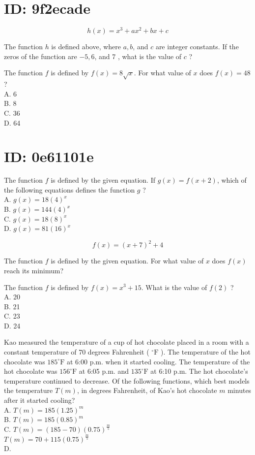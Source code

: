 \section*{ID: 9f2ecade}
$$
h(x)=x^{3}+a x^{2}+b x+c
$$

The function $h$ is defined above, where $a, b$, and $c$ are integer constants. If the zeros of the function are $-5,6$, and 7 , what is the value of $c$ ?

The function $f$ is defined by $f(x)=8 \sqrt{x}$. For what value of $x$ does $f(x)=48$ ?\\
A. 6\\
B. 8\\
C. 36\\
D. 64

\section*{ID: 0e61101e}
The function $f$ is defined by the given equation. If $g(x)=f(x+2)$, which of the following equations defines the function $g$ ?\\
A. $g(x)=18(4)^{x}$\\
B. $g(x)=144(4)^{x}$\\
C. $g(x)=18(8)^{x}$\\
D. $g(x)=81(16)^{x}$

$$
f(x)=(x+7)^{2}+4
$$

The function $f$ is defined by the given equation. For what value of $x$ does $f(x)$ reach its minimum?

The function $f$ is defined by $f(x)=x^{3}+15$. What is the value of $f(2)$ ?\\
A. 20\\
B. 21\\
C. 23\\
D. 24

Kao measured the temperature of a cup of hot chocolate placed in a room with a constant temperature of 70 degrees Fahrenheit ( ${ }^{\circ} \mathrm{F}$ ). The temperature of the hot chocolate was $185^{\circ} \mathrm{F}$ at 6:00 p.m. when it started cooling. The temperature of the hot chocolate was $156^{\circ} \mathrm{F}$ at 6:05 p.m. and $135^{\circ} \mathrm{F}$ at 6:10 p.m. The hot chocolate's temperature continued to decrease. Of the following functions, which best models the temperature $T(m)$, in degrees Fahrenheit, of Kao's hot chocolate $m$ minutes after it started cooling?\\
A. $T(m)=185(1.25)^{m}$\\
B. $T(m)=185(0.85)^{m}$\\
C. $T(m)=(185-70)(0.75)^{\frac{m}{5}}$\\
$T(m)=70+115(0.75)^{\frac{m}{5}}$\\
D.

